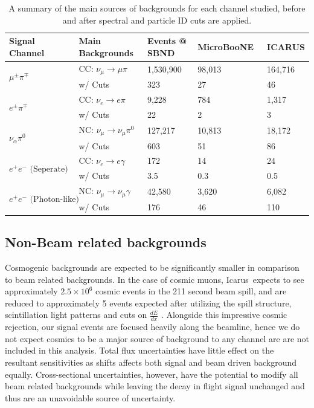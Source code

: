 \documentclass[11pt, a4paper]{article}
\def\muboone{MicroBooNE}
\def\icarus{Icarus}
\begin{document}
\begin{table}[t]
\centering
\begin{tabular}{ l | l | l| l | l}
	Signal Channel & Main Backgrounds & Events @ SBND & \muboone\ & ICARUS \\
\hline\hline
\multirow{2}{*}{$\mu^\pm \pi^\mp$} & CC: $\nu_\mu  \rightarrow \mu \pi  $ & 1,530,900  & 98,013 & 164,716\\
													 & w/ Cuts &323 & 27 & 46 \\ \hline
\multirow{2}{*}{$ e^\pm \pi^\mp$} & CC: $\nu_e  \rightarrow e \pi  $ & 9,228  & 784 & 1,317\\
													 & w/ Cuts &22 & 2 & 3 \\ \hline
\multirow{2}{*}{$ \nu_\alpha \pi^0$} & NC: $\nu_\mu  \rightarrow \nu_\mu \pi^0 $ &  127,217 & 10,813 & 18,172\\
													 & w/ Cuts &603 & 51 & 86 \\ \hline
 \multirow{2}{*}{$ e^+e^- \text{ (Seperate)} $} & CC: $\nu_e  \rightarrow e \gamma  $ &  172 & 14 & 24\\
													 & w/ Cuts &3.5 & 0.3 & 0.5\\ \hline
  \multirow{2}{*}{$ e^+ e^- \text{ (Photon-like)}$} & NC: $\nu_\mu  \rightarrow \nu_\mu \gamma $ &  42,580 & 3,620 & 6,082\\
													 & w/ Cuts &176 & 46 & 110 \\ 
 \hline \hline

\end{tabular}
\caption{\label{tab:Rates} A summary of the main sources of backgrounds for each channel studied, before and after spectral and particle ID cuts are applied. }
\end{table}



\subsection{Non-Beam related backgrounds}
Cosmogenic backgrounds are expected to be significantly smaller in comparison to beam related backgrounds. In the case of cosmic muons, \icarus\ expects to see approximately $2.5 \times 10^{6}$ cosmic events in the 211 second beam spill,
and are reduced to approximately 5 events expected after utilizing the spill
structure, scintillation light patterns and cuts on $\frac{d E}{d x}$
\cite{Antonello:2015lea}.  Alongside this impressive cosmic rejection, our signal
events are focused heavily along the beamline, hence we do not expect cosmics
to be a major source of background to any channel are are not included in this
analysis. Total flux uncertainties have little effect on the resultant
sensitivities as shifts affects both signal and beam driven background equally.
Cross-sectional uncertainties, however, have the potential to modify all beam
related backgrounds while leaving the decay in flight signal unchanged and thus
are an unavoidable source of uncertainty.
\end{document}
